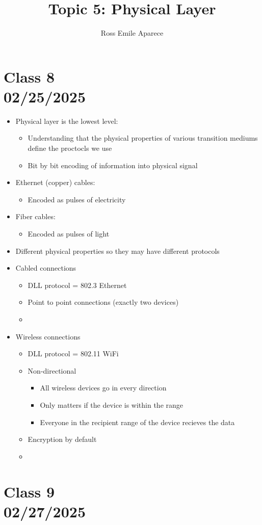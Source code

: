 \documentclass{article}
\title{Topic 5: Physical Layer}
\date{}
\author{Ross Emile Aparece}
\begin{document}
\maketitle

\section*{Class 8 \\ 02/25/2025}\label{sec:Class 8}
\begin{itemize}
    \item Physical layer is the lowest level:
    \begin{itemize}
        \item Understanding that the physical properties of various transition mediums define the proctocls we use
        \item Bit by bit encoding of information into physical signal
    \end{itemize}
    \item Ethernet (copper) cables: 
    \begin{itemize}
        \item Encoded as pulses of electricity 
    \end{itemize}
    \item Fiber cables:
    \begin{itemize}
        \item Encoded as pulses of light
    \end{itemize}
    \item Different physical properties so they may have different protocols
    \item Cabled connections
    \begin{itemize}
        \item DLL protocol = 802.3 Ethernet
        \item Point to point connections (exactly two devices)
        \item 
    \end{itemize}
    \item Wireless connections
    \begin{itemize}
        \item DLL protocol = 802.11 WiFi
        \item Non-directional 
        \begin{itemize}
            \item All wireless devices go in every direction
            \item Only matters if the device is within the range
            \item Everyone in the recipient range of the device recieves the data
        \end{itemize}
        \item Encryption by default
        \item 
    \end{itemize}
\end{itemize}

\section*{Class 9 \\ 02/27/2025}\label{sec:Class 9}
\end{document}
